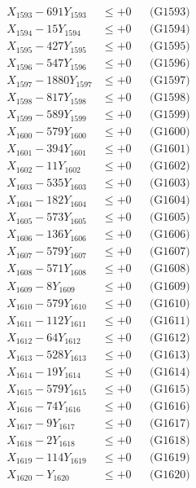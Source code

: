 \documentclass[a4paper,10pt]{article}
\begin{document}
{\begin{align}
X_{1593} - 691Y_{1593} &\leq +0 && \text{(G1593)} \\
X_{1594} - 15Y_{1594} &\leq +0 && \text{(G1594)} \\
X_{1595} - 427Y_{1595} &\leq +0 && \text{(G1595)} \\
X_{1596} - 547Y_{1596} &\leq +0 && \text{(G1596)} \\
X_{1597} - 1880Y_{1597} &\leq +0 && \text{(G1597)} \\
X_{1598} - 817Y_{1598} &\leq +0 && \text{(G1598)} \\
X_{1599} - 589Y_{1599} &\leq +0 && \text{(G1599)} \\
X_{1600} - 579Y_{1600} &\leq +0 && \text{(G1600)} \\
\allowbreak
X_{1601} - 394Y_{1601} &\leq +0 && \text{(G1601)} \\
X_{1602} - 11Y_{1602} &\leq +0 && \text{(G1602)} \\
X_{1603} - 535Y_{1603} &\leq +0 && \text{(G1603)} \\
X_{1604} - 182Y_{1604} &\leq +0 && \text{(G1604)} \\
X_{1605} - 573Y_{1605} &\leq +0 && \text{(G1605)} \\
X_{1606} - 136Y_{1606} &\leq +0 && \text{(G1606)} \\
X_{1607} - 579Y_{1607} &\leq +0 && \text{(G1607)} \\
X_{1608} - 571Y_{1608} &\leq +0 && \text{(G1608)} \\
X_{1609} - 8Y_{1609} &\leq +0 && \text{(G1609)} \\
X_{1610} - 579Y_{1610} &\leq +0 && \text{(G1610)} \\
\allowbreak
X_{1611} - 112Y_{1611} &\leq +0 && \text{(G1611)} \\
X_{1612} - 64Y_{1612} &\leq +0 && \text{(G1612)} \\
X_{1613} - 528Y_{1613} &\leq +0 && \text{(G1613)} \\
X_{1614} - 19Y_{1614} &\leq +0 && \text{(G1614)} \\
X_{1615} - 579Y_{1615} &\leq +0 && \text{(G1615)} \\
X_{1616} - 74Y_{1616} &\leq +0 && \text{(G1616)} \\
X_{1617} - 9Y_{1617} &\leq +0 && \text{(G1617)} \\
X_{1618} - 2Y_{1618} &\leq +0 && \text{(G1618)} \\
X_{1619} - 114Y_{1619} &\leq +0 && \text{(G1619)} \\
X_{1620} - Y_{1620} &\leq +0 && \text{(G1620)} \\

\end{align}}
\end{document}
